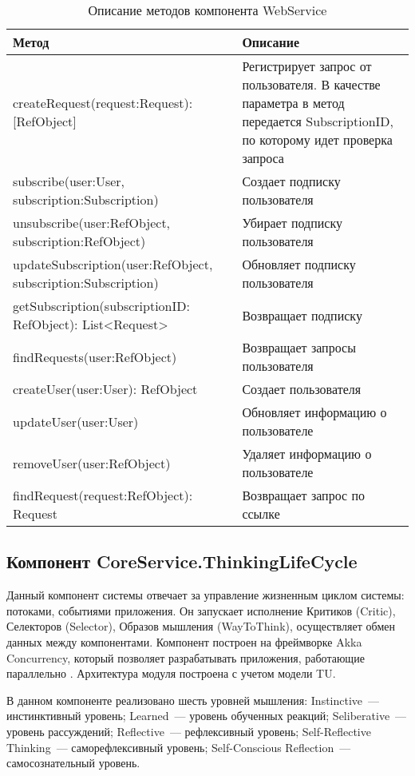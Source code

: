 \begin{table} [htbp]
   \center
   \parbox{15cm}{\caption{Описание методов компонента WebService}\label{WebServiceDescription}}
  \begin{tabular}{| p{8cm} |p{7cm} |}
  
  \hline
\textbf{Метод} & \textbf{Описание} \\
  \hline
  createRequest(request:Request): [RefObject] & Регистрирует запрос от пользователя. В качестве параметра в метод передается SubscriptionID, по которому идет проверка запроса \\
  
  \hline
  subscribe(user:User, subscription:Subscription)  & Создает подписку пользователя \\
  \hline
  unsubscribe(user:RefObject, subscription:RefObject)   & Убирает подписку пользователя \\
  \hline
  updateSubscription(user:RefObject, subscription:Subscription)   & Обновляет подписку пользователя \\
  \hline
  getSubscription(subscriptionID: RefObject): List<Request>    & Возвращает подписку \\
  \hline
  findRequests(user:RefObject)     & Возвращает запросы пользователя \\
  \hline
  createUser(user:User): RefObject     & Создает пользователя \\
  \hline
  updateUser(user:User)     & Обновляет информацию о пользователе \\ 
  \hline
  removeUser(user:RefObject)     & Удаляет информацию о пользователе \\ 
  \hline
  findRequest(request:RefObject): Request     & Возвращает запрос по ссылке \\ 
 
  \hline
\end{tabular}

\end{table}
\clearpage
\subsection{Компонент CoreService.ThinkingLifeCycle} \label{ThinkingLifeCycle}
Данный компонент системы отвечает за управление жизненным циклом системы: потоками, событиями приложения. Он запускает исполнение Критиков (Critic), Селекторов (Selector), Образов мышления (WayToThink), осуществляет обмен данных между компонентами. Компонент построен на фреймворке Akka Concurrency, который позволяет разрабатывать приложения, работающие параллельно \cite{AkkaConcurrency}. Архитектура модуля построена с учетом модели TU. \par
В данном компоненте реализовано шесть уровней мышления: Instinctive~--- инстинктивный уровень; Learned~--- уровень обученных реакций; Seliberative~--- уровень рассуждений; Reflective~--- рефлексивный уровень; Self-Reflective Thinking~--- саморефлексивный уровень; Self-Conscious Reflection~--- самосознательный уровень. \par


